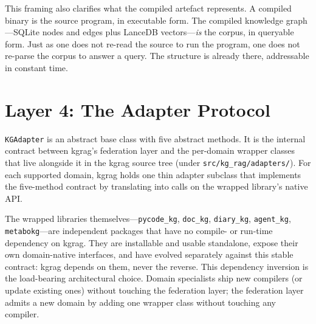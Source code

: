 \documentclass[10pt]{article}
\begin{document}
This framing also clarifies what the compiled artefact represents. A compiled
binary is the source program, in executable form. The compiled knowledge
graph---SQLite nodes and edges plus LanceDB vectors---\emph{is} the corpus, in
queryable form. Just as one does not re-read the source to run the program,
one does not re-parse the corpus to answer a query. The structure is already
there, addressable in constant time.

\section{Layer 4: The Adapter Protocol}

\texttt{KGAdapter} is an abstract base class with five abstract methods. It
is the internal contract between kgrag's federation layer and the per-domain
wrapper classes that live alongside it in the kgrag source tree (under
\texttt{src/kg\_rag/adapters/}). For each supported domain, kgrag holds one
thin adapter subclass that implements the five-method contract by translating
into calls on the wrapped library's native API.

The wrapped libraries themselves---\texttt{pycode\_kg}, \texttt{doc\_kg},
\texttt{diary\_kg}, \texttt{agent\_kg}, \texttt{metabokg}---are independent
packages that have no compile- or run-time dependency on kgrag. They are
installable and usable standalone, expose their own domain-native interfaces,
and have evolved separately against this stable contract: kgrag depends on
them, never the reverse. This dependency inversion is the load-bearing
architectural choice. Domain specialists ship new compilers (or update
existing ones) without touching the federation layer; the federation layer
admits a new domain by adding one wrapper class without touching any compiler.
\end{document}
